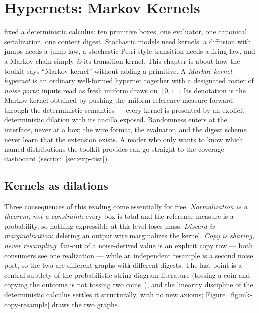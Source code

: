\chapter{Hypernets: Markov Kernels}
\label{ch:qtsl-markov-kernels}

\noindent\draftmark\medskip

 fixed a
deterministic calculus: ten primitive boxes, one evaluator, one
canonical serialization, one content digest. Stochastic models need
kernels: a diffusion with jumps needs a jump law, a stochastic
Petri-style transition needs a firing law, and a Markov chain simply
\emph{is} its transition kernel. This chapter is about how the
toolkit says ``Markov kernel'' without adding a primitive. A
\emph{Markov-kernel hypernet} is an ordinary well-formed hypernet
together with a designated roster of \emph{noise ports}: inputs read as
fresh uniform draws on $[0,1]$. Its denotation is the Markov kernel
obtained by pushing the uniform reference measure forward through the
deterministic semantics --- every kernel is presented by an explicit
deterministic dilation with its ancilla exposed. Randomness enters at
the interface, never at a box; the wire format, the evaluator, and the
digest scheme never learn that the extension exists. A reader who only
wants to know which named distributions the toolkit provides can go
straight to the coverage dashboard (section~\ref{sec:exp-dist}).

\section{Kernels as dilations}
\label{sec:mk-dilation}

Three consequences of this reading come essentially for free. \emph{Normalization is a
theorem, not a constraint}: every box is total and the reference
measure is a probability, so nothing expressible at this level loses
mass. \emph{Discard is marginalization}: deleting an output wire
marginalizes the kernel. \emph{Copy is sharing, never resampling}:
fan-out of a noise-derived value is an explicit copy row --- both
consumers see one realization --- while an independent resample is a
second noise port, so the two are different graphs with different
digests. The last point is a central subtlety of the probabilistic
string-diagram literature (tossing a coin and copying the outcome is
not tossing two coins~\cite{fritzliang22,bonchi26b}), and the
linearity discipline of the deterministic calculus settles it
structurally, with no new axioms;
Figure~\ref{fig:mk-copy-resample} draws the two graphs.

